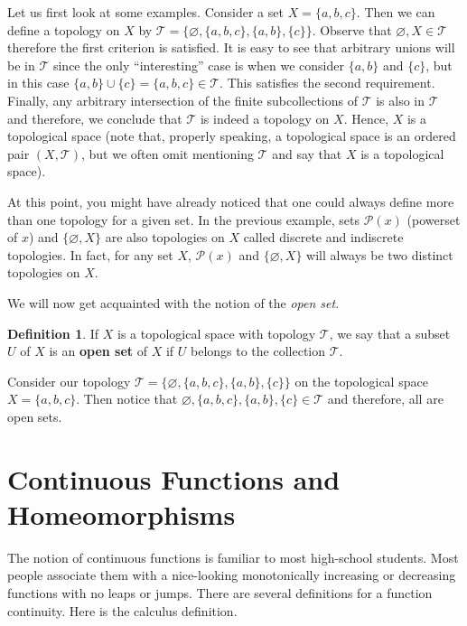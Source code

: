 \documentclass[12pt]{article}
\newcommand{\pset}{\mathcal{P}}                  %
\newcommand{\topology}{\mathcal{T}}              %
\renewcommand{\emptyset}{\varnothing}            %
\theoremstyle{definition}
\newtheorem*{definition}{Definition}
\begin{document}
Let us first look at some examples. Consider a set $X = \{a, b, c\}$.
Then we can define a topology on $X$ by $\topology = \{\emptyset, \{a, b, c\}, \{a, b\}, \{c\}\}$.
Observe that $\emptyset, X \in \topology$ therefore the first criterion is satisfied.
It is easy to see that arbitrary unions will be in $\topology$ since the only ``interesting''
case is when we consider $\{a, b\}$ and $\{c\}$, but in this case $\{a, b\} \cup \{c\} = \{a, b, c\} \in \topology$.
This satisfies the second requirement. Finally, any arbitrary intersection of the finite subcollections of $\topology$
is also in $\topology$ and therefore, we conclude that $\topology$ is indeed a topology on $X$.
Hence, $X$ is a topological space (note that, properly speaking, a topological space is an ordered pair $(X, \topology)$,
but we often omit mentioning $\topology$ and say that $X$ is a topological space).

\bigskip

At this point, you might have already noticed that one could always define more than one topology
for a given set. In the previous example, sets $\pset{(x)}$ (powerset of $x$) and $\{\emptyset, X\}$
are also topologies on $X$ called discrete and indiscrete topologies. In fact, for any set $X$,
$\pset{(x)}$ and $\{\emptyset, X\}$ will always be two distinct topologies on $X$.

\bigskip

We will now get acquainted with the notion of the \textit{open set}.

\begin{definition}
\cite{4}  If $X$ is a topological space with topology $\topology$, we say that a subset $U$ of $X$ is an
\textbf{open set} of $X$ if $U$ belongs to the collection $\topology$.
\end{definition}

Consider our topology $\topology = \{\emptyset, \{a, b, c\}, \{a, b\}, \{c\}\}$ on the topological space $X = \{a, b, c\}$.
Then notice that $\emptyset, \{a, b, c\}, \{a, b\}, \{c\} \in \topology$ and therefore, all are open sets.


\section*{\centering Continuous Functions and Homeomorphisms}
The notion of continuous functions is familiar to most high-school students.
Most people associate them with a nice-looking monotonically increasing or decreasing
functions with no leaps or jumps. There are several definitions for a function continuity.
Here is the calculus definition.
\end{document}
